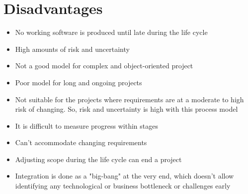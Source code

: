 \documentclass{article}[18pt]
\begin{document}
\section{Disadvantages}
\begin{itemize}
	\item No working software is produced until late during the life cycle
	\item High amounts of risk and uncertainty
	\item Not a good model for complex and object-oriented project
	\item Poor model for long and ongoing projects
	\item Not suitable for the projects where requirements are at a moderate to high risk of changing. So, risk and uncertainty is high with this process model
	\item It is difficult to measure progress within stages
	\item Can't accommodate changing requirements
	\item Adjusting scope during the life cycle can end a project
	\item Integration is done as a "big-bang" at the very end, which doesn't allow identifying any technological or business bottleneck or challenges early
\end{itemize}
\end{document}
